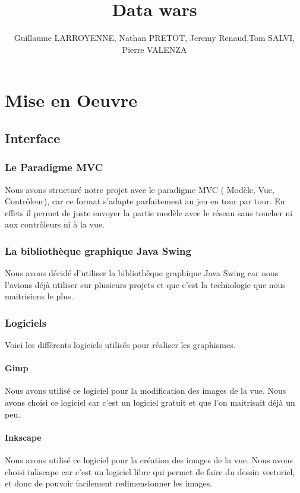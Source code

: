 \documentclass[a4paper,11pt]{report}
\title{Data wars}
\author{Guillaume LARROYENNE, Nathan PRETOT, Jeremy Renaud,Tom SALVI, Pierre VALENZA}
\begin{document}
\maketitle
\tableofcontents

\begin{abstract}
\end{abstract}

\chapter{Mise en Oeuvre}
\section{Interface}
\subsection{Le Paradigme MVC}
Nous avons structuré notre projet avec le paradigme MVC ( Modèle, Vue, Contrôleur), car ce format s'adapte parfaitement au jeu en tour par tour. En effets il permet de juste envoyer la partie modèle avec le réseau sans toucher ni aux contrôleurs ni à la vue.   
\subsection{La bibliothèque graphique Java Swing}
Nous avons décidé d'utiliser la bibliothèque graphique Java Swing car nous l'avions déjà utiliser sur plusieurs projets et que c'est la technologie que nous maitrisions le plus.
\subsection{Logiciels}
Voici les différents logiciels utilisés pour réaliser les graphismes.
\subsubsection{Gimp}
Nous avons utilisé ce logiciel pour la modification des images de la vue. Nous avons choisi ce logiciel car c'est un logiciel gratuit et que l'on maitrisait déjà un peu. 
\subsubsection{Inkscape}
Nous avons utilisé ce logiciel pour la création des images de la vue. Nous avons choisi inkscape car c'est un logiciel libre qui permet de faire du dessin vectoriel, et donc de pouvoir facilement redimensionner les images. 
\end{document}
